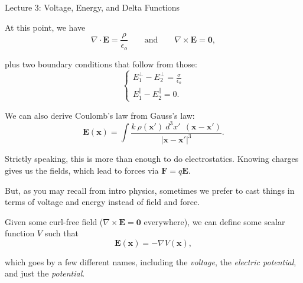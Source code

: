\documentclass{article}
\begin{document}
\begin{center}
    {\Huge Lecture 3: Voltage, Energy, and Delta Functions} \\[0.5cm]
\end{center}

\vspace{1cm}

At this point, we have
\begin{equation*}
    \nabla \cdot \bm{E} = \frac{\rho}{\epsilon_o} \qquad \text{and} \qquad \nabla \times \bm{E} = \bm{0},
\end{equation*}

plus two boundary conditions that follow from those:
\begin{equation*}
    \begin{cases} \displaystyle E_{1}^{\perp} - E_{2}^{\perp} = \frac{\sigma}{\epsilon_o} \\ \displaystyle E_{1}^{\parallel} - E_{2}^{\parallel} = 0. \end{cases}
\end{equation*}

We can also derive Coulomb's law from Gauss's law:
\begin{equation*}
    \bm{E}(\bm{x}) = \int \frac{k\ \rho(\bm{x'})\ d^3x'\ \ \left( \bm{x} - \bm{x'} \right)}{\left| \bm{x} - \bm{x'} \right|^3}.
\end{equation*}

Strictly speaking, this is more than enough to do electrostatics. Knowing charges gives us the fields, which lead to forces via $\displaystyle \bm{F} = q\bm{E}$.

\vspace{1em}

But, as you may recall from intro physics, sometimes we prefer to cast things in terms of voltage and energy instead of field and force.

\vspace{1em}

Given some curl-free field ($\nabla \times \bm{E} = \bm{0}$ everywhere), we can define some scalar function $V$ such that
\begin{equation*}
    \bm{E}(\bm{x}) = -\nabla V (\bm{x}),
\end{equation*}

which goes by a few different names, including the \emph{voltage}, the \emph{electric potential}, and just the \emph{potential}.

\vspace{1em}
\end{document}
